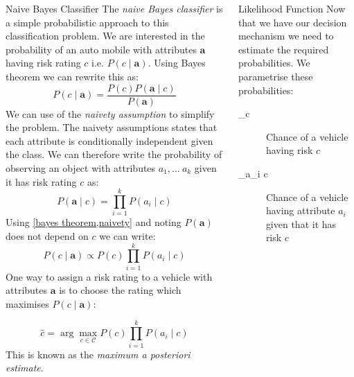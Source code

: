 \documentclass{beamer}
\newcommand{\defn}[1]{\textit{\color{ETH10}#1}}
\begin{document}
\begin{frame}
\begin{columns}
\begin{column}{0.30\paperwidth}
		\begin{block}{Naive Bayes Classifier}
			The \defn{naive Bayes classifier} is a simple probabilistic approach to this classification problem. We are interested in the probability of an auto mobile with attributes $\mathbf{a}$ having risk rating $c$ i.e. $P(c \mid \mathbf{a})$. Using Bayes theorem we can rewrite this as:
			\begin{equation}\label{bayes theorem}
				P(c \mid \mathbf{a}) = \frac{P(c)P(\mathbf{a} \mid c)}{P(\mathbf{a})}
			\end{equation}
			We can use of the \defn{naivety assumption} to simplify the problem.
			The naivety assumptions states that each attribute is conditionally independent given the class.
			We can therefore write the probability of observing an object with attributes $a_1, \dots\ a_k$ given it has risk rating $c$ as:
			\begin{equation} \label{naivety}
				P(\mathbf{a} \mid c) = \prod_{i=1}^k P(a_i \mid c)
			\end{equation}
			Using \cref{bayes theorem,naivety} and noting $P(\mathbf{a})$ does not depend on $c$ we can write:
			\begin{equation}
				P(c \mid \mathbf{a}) \propto P(c)\prod_{i=1}^{k}P(a_i \mid c)
			\end{equation}
			One way to assign a risk rating to a vehicle with attributes $\mathbf{a}$ is to choose the rating which maximises $P(c \mid \mathbf{a})$:
			
			\begin{equation} \label{map_estimate}
				\hat c = \arg\max_{c \in \mathcal{C}} P(c)\prod_{i=1}^{k}P(a_i \mid c)
			\end{equation}
			This is known as the \defn{maximum a posteriori estimate}.
		\end{block}

	\end{column}

	\begin{column}{0.30\paperwidth}

		\begin{block}{Likelihood Function}
			Now that we have our decision mechanism we need to estimate the required probabilities. We parametrise these probabilities:
			\begin{description}
				\item[\theta_c] Chance of a vehicle having risk $c$
				\item[\theta_{a_i \mid c}] Chance of a vehicle having attribute $a_i$ given that it has risk $c$
			\end{description}\vspace{0.5em}


\end{block}
\end{column}
\end{columns}
\end{frame}
\end{document}
